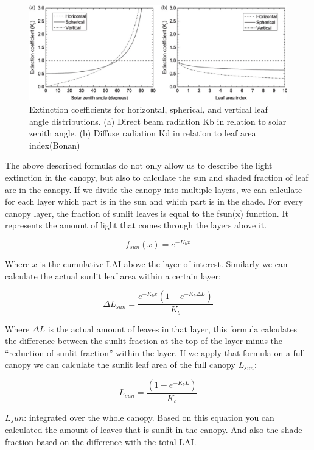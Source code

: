 \documentclass[12pt,oneside]{book}
\begin{document}
\begin{figure}

{\centering \includegraphics[width=0.8\linewidth]{figures/chap3/f312_Kb_angle} 

}

\caption{Extinction coefficients for horizontal, spherical, and vertical leaf angle distributions. (a) Direct beam radiation Kb in relation to solar zenith angle. (b) Diffuse radiation Kd in relation to leaf area index(Bonan)}\label{fig:f312}
\end{figure}

The above described formulas do not only allow us to describe the light
extinction in the canopy, but also to calculate the sun and shaded
fraction of leaf are in the canopy. If we divide the canopy into
multiple layers, we can calculate for each layer which part is in the
sun and which part is in the shade. For every canopy layer, the fraction
of sunlit leaves is equal to the fsun(x) function. It represents the
amount of light that comes through the layers above it.

\[
f_{sun} (x) = e^{-K_b x}
\]

Where \(x\) is the cumulative LAI above the layer of interest. Similarly
we can calculate the actual sunlit leaf area within a certain layer:

\[
\Delta L_{sun} = \frac{e^{-K_b x} \left(1 - e^{-K_b \Delta L} \right)}{K_b}
\]

Where \(\Delta L\) is the actual amount of leaves in that layer, this
formula calculates the difference between the sunlit fraction at the top
of the layer minus the ``reduction of sunlit fraction'' within the
layer. If we apply that formula on a full canopy we can calculate the
sunlit leaf area of the full canopy \(L_{sun}\):

\[
L_{sun} = \frac{\left(1 - e^{-K_b L} \right)}{K_b}
\]

\(L_sun\): integrated over the whole canopy. Based on this equation you
can calculated the amount of leaves that is sunlit in the canopy. And
also the shade fraction based on the difference with the total LAI.
\end{document}
